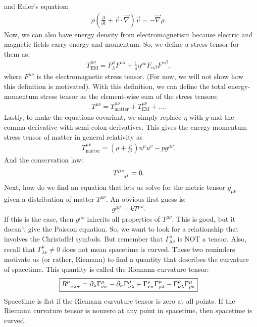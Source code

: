 \documentclass{article}
\theoremstyle{definition}
\begin{document}
and Euler's equation:
\begin{align*}
\rho\left( \frac{\partial}{\partial t } + \vec{v}\cdot\vec{\nabla}\right)\vec{v} = -\vec{\nabla}\rho. 
\end{align*}
Now, we can also have energy density from electromagnetism because electric and magnetic fields carry energy and momentum. So, we define a stress tensor for them as:
\begin{align*}
\boxed{T^{\mu\nu}_{\text{EM}} = F^{\mu}_{\lambda}F^{\nu\lambda} + \frac{1}{4}\eta^{\mu\nu}F_{\alpha\beta}F^{\alpha\beta} },
\end{align*}
where $F^{\mu\nu}$ is the electromagnetic stress tensor. (For now, we will not show how this definition is motivated). With this definition, we can define the total energy-momentum stress tensor as the element-wise sum of the stress tensors:
\begin{align*}
T^{\mu\nu} = T^{\mu\nu}_{\text{matter}} + T^{\mu\nu}_{\text{EM}} + \dots.
\end{align*}
Lastly, to make the equations covariant, we simply replace $\eta$ with $g$ and the comma derivative with semi-colon derivatives. This gives the energy-momentum stress tensor of matter in general relativity as
\begin{align*}
T^{\mu\nu}_{\text{matter}} = \left(\rho + \frac{p}{c^2} \right)u^\mu u^\nu  - pg^{\mu\nu}.
\end{align*}
And the conservation law:
\begin{align*}
\tensor{T}{^{\mu\nu}_{;\mu}} = 0.
\end{align*}
Next, how do we find an equation that lets us solve for the metric tensor $g_{\mu\nu}$ given a distribution of matter $T^{\mu\nu}$. An obvious first guess is:
\begin{align*}
g^{\mu\nu} = kT^{\mu\nu}.
\end{align*}
If this is the case, then $g^{\mu\nu}$ inherits all properties of $T^{\mu\nu}$. This is good, but it doesn't give the Poisson equation. So, we want to look for a relationship that involves the Christoffel symbols. But remember that $\Gamma^{\lambda}_{\mu\nu}$ is NOT a tensor. Also, recall that $\Gamma^{\mu}_{\lambda\nu} \neq 0$ does not mean spacetime is curved. These two reminders motivate us (or rather, Riemann) to find a quantity that describes the curvature of spacetime. This quantity is called the Riemann curvature tensor:
\begin{align*}
\boxed{\tensor{R}{^{\mu}_{\nu\lambda\sigma}} = \partial_\lambda \Gamma^{\mu}_{\nu\sigma} - \partial_\sigma \Gamma^{\mu}_{\nu\lambda} + \Gamma^{\rho}_{\nu\sigma}\Gamma^{\mu}_{\rho\lambda} - \Gamma^{\rho}_{\nu\lambda}\Gamma^{\mu}_{\rho\sigma}}
\end{align*}  
Spacetime is flat if the Riemann curvature tensor is zero at all points. If the Riemann curvature tensor is nonzero at any point in spacetime, then spacetime is curved.
\end{document}
